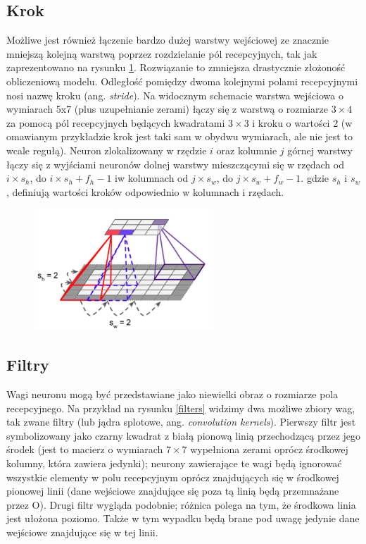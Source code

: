 \documentclass{article}
\begin{document}
\subsection{Krok}
Możliwe jest również łączenie bardzo dużej warstwy wejściowej ze znacznie mniejszą kolejną warstwą poprzez rozdzielanie pól recepcyjnych, tak jak zaprezentowano na rysunku \ref{step}. Rozwiązanie to zmniejsza drastycznie złożoność obliczeniową modelu. Odległość pomiędzy dwoma kolejnymi polami recepcyjnymi nosi nazwę kroku (ang. \textit{stride}). Na widocznym schemacie warstwa wejściowa o wymiarach 5x7 (plus uzupełnianie zerami) łączy się z warstwą o rozmiarze $3 \times 4$ za pomocą pól recepcyjnych będących kwadratami $3 \times 3$ i kroku o wartości 2 (w omawianym przykładzie krok jest taki sam w obydwu wymiarach, ale nie jest to wcale regułą). Neuron zlokalizowany w rzędzie $i$ oraz kolumnie $j$ górnej warstwy łączy się z wyjściami neuronów dolnej warstwy mieszczącymi się w rzędach od $i\times s_{h}$, do $i \times s_{h}+f_{h}-1$ iw kolumnach od $j \times s_{w}$, do $j \times s_{w}+f_{w}-1$. gdzie $s_{h}$ i $s_{w}$, definiują wartości kroków odpowiednio w kolumnach i rzędach. \cite{geron}
\begin{figure}[H]
	\centering
	\includegraphics[width=0.6\textwidth,keepaspectratio=true]{step}
	\caption{}
	\label{step}
\end{figure}


\subsection{Filtry}
Wagi neuronu mogą być przedstawiane jako niewielki obraz o rozmiarze pola recepcyjnego. Na przykład na rysunku \ref{filters} widzimy dwa możliwe zbiory wag, tak zwane filtry (lub jądra splotowe, ang. \textit{convolution kernels}). Pierwszy filtr jest symbolizowany jako czarny kwadrat z białą pionową linią przechodzącą przez jego środek (jest to macierz o wymiarach $7 \times 7$ wypełniona zerami oprócz środkowej kolumny, która zawiera jedynki); neurony zawierające te wagi będą ignorować wszystkie elementy w polu recepcyjnym oprócz znajdujących się w środkowej pionowej linii (dane wejściowe znajdujące się poza tą linią będą przemnażane przez O). Drugi filtr wygląda podobnie; różnica polega na tym, że środkowa linia jest ułożona poziomo. Także w tym wypadku będą brane pod uwagę jedynie dane wejściowe znajdujące się w tej linii. \cite{geron}
\end{document}
